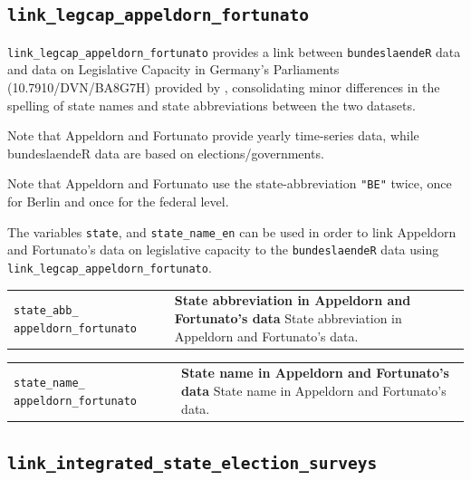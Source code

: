 \documentclass[
]{scrartcl}
\begin{document}
\newpage

\hypertarget{link_legcap_appeldorn_fortunato}{%
\subsection{\texorpdfstring{\texttt{link\_legcap\_appeldorn\_fortunato}}{link\_legcap\_appeldorn\_fortunato}}\label{link_legcap_appeldorn_fortunato}}

\texttt{link\_legcap\_appeldorn\_fortunato} provides a link between
\texttt{bundeslaendeR} data and data on Legislative Capacity in
Germany's Parliaments (10.7910/DVN/BA8G7H) provided by
\textcite{fortunatoReplicationDataLegislative2021}
\parencite[for more details see][]{appeldornLegislativeCapacityGermany2022},
consolidating minor differences in the spelling of state names and state
abbreviations between the two datasets.

Note that Appeldorn and Fortunato provide yearly time-series data, while
bundeslaendeR data are based on elections/governments.

Note that Appeldorn and Fortunato use the state-abbreviation
\texttt{"BE"} twice, once for Berlin and once for the federal level.

The variables \texttt{state}, and \texttt{state\_name\_en} can be used
in order to link Appeldorn and Fortunato's data on legislative capacity
to the \texttt{bundeslaendeR} data using
\texttt{link\_legcap\_appeldorn\_fortunato}.

\begin{longtable}{p{3.2cm}| p{11cm}}
\texttt{state\_abb\_
appeldorn\_fortunato} &\textbf{State abbreviation in Appeldorn and Fortunato's data}\newline 
State abbreviation in Appeldorn and Fortunato's data.
\end{longtable}

\begin{longtable}{p{3.2cm}| p{11cm}}
\texttt{state\_name\_
appeldorn\_fortunato} &\textbf{State name in Appeldorn and Fortunato's data}\newline 
State name in Appeldorn and Fortunato's data.
\end{longtable}

\newpage

\hypertarget{link_integrated_state_election_surveys}{%
\subsection{\texorpdfstring{\texttt{link\_integrated\_state\_election\_surveys}}{link\_integrated\_state\_election\_surveys}}\label{link_integrated_state_election_surveys}}
\end{document}
